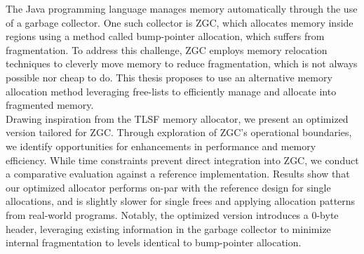 

The Java programming language manages memory automatically through the use of a garbage collector. One such collector is ZGC, which allocates memory inside regions using a method called bump-pointer allocation, which suffers from fragmentation. To address this challenge, ZGC employs memory relocation techniques to cleverly move memory to reduce fragmentation, which is not always possible nor cheap to do. This thesis proposes to use an alternative memory allocation method leveraging free-lists to efficiently manage and allocate into fragmented memory.\\

Drawing inspiration from the TLSF memory allocator, we present an optimized version tailored for ZGC. Through exploration of ZGC's operational boundaries, we identify opportunities for enhancements in performance and memory efficiency. While time constraints prevent direct integration into ZGC, we conduct a comparative evaluation against a reference implementation. Results show that our optimized allocator performs on-par with the reference design for single allocations, and is slightly slower for single frees and applying allocation patterns from real-world programs. Notably, the optimized version introduces a 0-byte header, leveraging existing information in the garbage collector to minimize internal fragmentation to levels identical to bump-pointer allocation.\\


